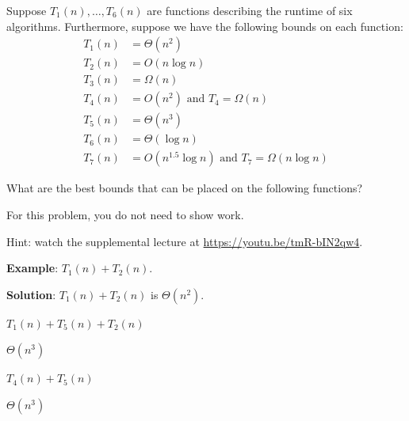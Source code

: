 \begin{prob}

    Suppose $T_1(n), \ldots, T_6(n)$ are functions
    describing the runtime of six algorithms. Furthermore, suppose we
    have the following bounds on each function:
    \begin{align*}
        T_1(n) &= \Theta(n^2)\\
        T_2(n) &= O(n \log n)\\
        T_3(n) &= \Omega(n)\\
        T_4(n) &= O(n^2) \text{ and } T_4 = \Omega(n)\\
        T_5(n) &= \Theta(n^3)\\
        T_6(n) &= \Theta(\log{n})\\
        T_7(n) &= O(n^{1.5} \log n) \text{ and } T_7 = \Omega(n \log{n})
    \end{align*}

    What are the best bounds that can be placed on the following functions?
    
    For this problem, you do not need to show work.

    Hint: watch the supplemental lecture at \url{https://youtu.be/tmR-bIN2qw4}.

    \textbf{Example}: $T_1(n) + T_2(n)$.

    \textbf{Solution}: $T_1(n) + T_2(n)$ is $\Theta(n^2)$.


    \begin{subprobset}

        \begin{subprob}
            $T_1(n) + T_5(n) + T_2(n)$

            \begin{soln}
                $\Theta(n^3)$
            \end{soln}
        \end{subprob}

        \begin{subprob}
            $T_4(n) + T_5(n)$

            \begin{soln}
                $\Theta(n^3)$
            \end{soln}
        \end{subprob}


\end{subprobset}
\end{prob}

